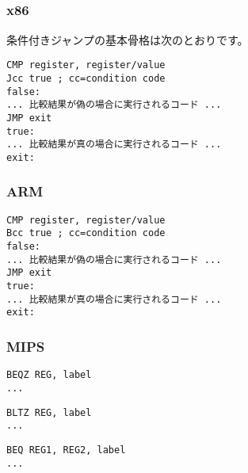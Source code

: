 \label{sec:Jcc}






\subsection{\Conclusion{}}

\subsubsection{x86}

条件付きジャンプの基本骨格は次のとおりです。

\begin{lstlisting}[caption=x86,style=customasmx86]
CMP register, register/value
Jcc true ; cc=condition code
false:
... 比較結果が偽の場合に実行されるコード ...
JMP exit 
true:
... 比較結果が真の場合に実行されるコード ...
exit:
\end{lstlisting}

\subsubsection{ARM}

\begin{lstlisting}[caption=ARM,style=customasmARM]
CMP register, register/value
Bcc true ; cc=condition code
false:
... 比較結果が偽の場合に実行されるコード ...
JMP exit 
true:
... 比較結果が真の場合に実行されるコード ...
exit:
\end{lstlisting}

\subsubsection{MIPS}

\begin{lstlisting}[caption=Check for zero,style=customasmMIPS]
BEQZ REG, label
...
\end{lstlisting}

\begin{lstlisting}[caption=Check for less than zero using pseudoinstruction,style=customasmMIPS]
BLTZ REG, label
...
\end{lstlisting}

\begin{lstlisting}[caption=Check for equal values,style=customasmMIPS]
BEQ REG1, REG2, label
...
\end{lstlisting}

